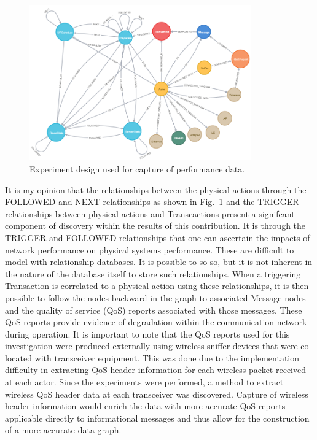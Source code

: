 \begin{figure}[!ht]
	\centering
	\includegraphics[width=0.85\textwidth]{chapter-gdb-appl/figures/database/graph_schema_updated_2.png}
	\caption{Experiment design used for capture of performance data.}
	\label{fig:concl:data-physical-actions-following}
\end{figure}

It is my opinion that the relationships between the physical actions through the FOLLOWED and NEXT relationships as shown in Fig.~\ref{fig:concl:data-physical-actions-following} and the TRIGGER relationships between physical actions and Transcactions present a signifcant component of discovery within the results of this contribution. It is through the TRIGGER and FOLLOWED relationships that one can ascertain the impacts of network performance on physical systems performance. These are difficult to model with relationship databases.  It is possible to so so, but it is not inherent in the nature of the database itself to store such relationships.  When a triggering Transaction is correlated to a physical action using these relationships, it is then possible to follow the nodes backward in the graph to associated Message nodes and the quality of service (QoS) reports associated with those messages. These QoS reports provide evidence of degradation within the communication network during operation.  It is important to note that the QoS reports used for this investigation were produced externally using wireless sniffer devices that were co-located with transceiver equipment.  This was done due to the implementation difficulty in extracting QoS header information for each wireless packet received at each actor.  Since the experiments were performed, a method to extract wireless QoS header data at each transceiver was discovered.  Capture of wireless header information would enrich the data with more accurate QoS reports applicable directly to informational messages and thus allow for the construction of a more accurate data graph.

